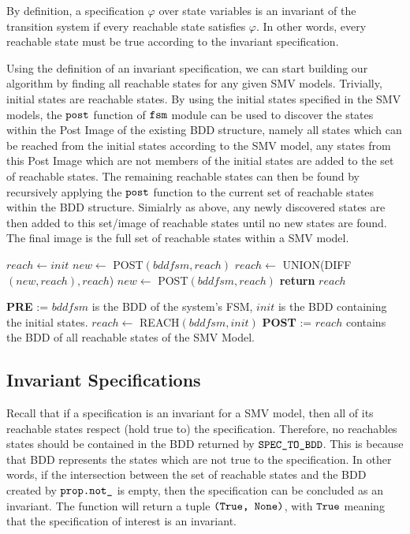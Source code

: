By definition, a specification $\varphi$ over state variables is an invariant of the transition system if every reachable state satisfies $\varphi$. In other words, every reachable state must be true according to the invariant specification.

\medskip

Using the definition of an invariant specification, we can start building our algorithm by finding all reachable states for any given SMV models. Trivially, initial states are reachable states. By using the initial states specified in the SMV models, the $\verb|post|$ function of $\verb|fsm|$ module can be used to discover the states within the Post Image of the existing BDD structure, namely all states which can be reached from the initial states according to the SMV model, any states from this Post Image which are not members of the initial states are added to the set of reachable states. The remaining reachable states can then be found by recursively applying the $\verb|post|$ function to the current set of reachable states within the BDD structure. Simialrly as above, any newly discovered states are then added to this set/image of reachable states until no new states are found. The final image is the full set of reachable states within a SMV model.

\medskip

\begin{algorithmic}[1] \label{algo1}
    \State $reach\leftarrow init$
    \State $new\leftarrow$ POST$(bddfsm, reach)$
        \State $reach\leftarrow$ UNION(DIFF$(new, reach),reach$)
        \State $new\leftarrow$ POST$(bddfsm, reach)$
    \EndWhile
    \State \textbf{return }$reach$
\EndFunction
\item[]
\State \textbf{PRE} := $bddfsm$ is the BDD of the system's FSM, $init$ is the BDD containing the initial states.
\State $reach\leftarrow$ REACH$(bddfsm, init)$
\State \textbf{POST} := $reach$ contains the BDD of all reachable states of the SMV Model.
\end{algorithmic}

\subsection{Invariant Specifications} \label{subsec:inv}

Recall that if a specification is an invariant for a SMV model, then all of its reachable states respect (hold true to) the specification. Therefore, no reachables states should be contained in the BDD returned by $\verb|SPEC_TO_BDD|$. This is because that BDD represents the states which are not true to the specification. In other words, if the intersection between the set of reachable states and the BDD created by $\verb|prop.not_|$ is empty, then the specification can be concluded as an invariant. The function will return a tuple $\verb|(True, None)|$, with $\verb|True|$ meaning that the specification of interest is an invariant.

